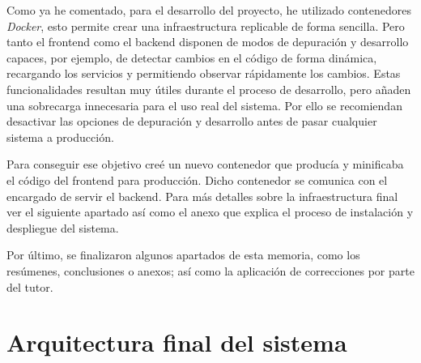 Como ya he comentado, para el desarrollo del proyecto, he utilizado contenedores \textit{Docker}, esto permite crear una infraestructura replicable de forma sencilla. Pero tanto el \gls{frontend} como el \gls{backend} disponen de modos de depuración y desarrollo capaces, por ejemplo, de detectar cambios en el código de forma dinámica, recargando los servicios y permitiendo observar rápidamente los cambios. Estas funcionalidades resultan muy útiles durante el proceso de desarrollo, pero añaden una sobrecarga innecesaria para el uso real del sistema. Por ello se recomiendan desactivar las opciones de depuración y desarrollo antes de pasar cualquier sistema a producción. 

Para conseguir ese objetivo creé un nuevo contenedor que producía y minificaba el código del \gls{frontend} para producción. Dicho contenedor se comunica con el encargado de servir el \gls{backend}. Para más detalles sobre la infraestructura final ver el siguiente apartado así como el anexo que explica el proceso de instalación y despliegue del sistema.

Por último, se finalizaron algunos apartados de esta memoria, como los resúmenes, conclusiones o anexos; así como la aplicación de correcciones por parte del tutor.

\section{Arquitectura final del sistema}

